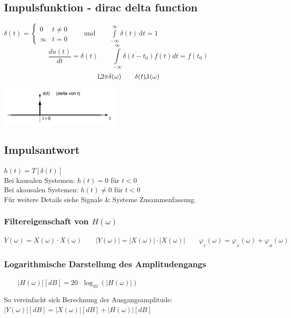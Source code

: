 \subsection{Impulsfunktion - dirac delta function}
	\begin{minipage}{10cm}
		$\delta (t)=\begin{cases} 0 & t\ne 0\\\infty & t=0\end{cases} \qquad
		\text{und} \qquad \int\limits_{-\infty}^\infty \delta(t) \, \mathrm dt = 1 $\\
		\[
			\frac{du(t)}{dt}=\delta(t) \qquad
			\int\limits_{-\infty}^{\infty}\delta(t-t_0)f(t)dt=f(t_0)
		\]
		\[
			1 \FT 2\pi \delta(\omega) \qquad \delta(t) \FT 1(\omega)
		\]
		 
	\end{minipage}
	\begin{minipage}{8cm}
		\includegraphics[width=6cm]{bilder/diracimpulse.png}
	\end{minipage}


	\subsection{Impulsantwort}
		$h(t) = T[\delta(t)] \qquad $\\
		Bei kausalen Systemen: $h(t) = 0$ für $t < 0$ \\   
		Bei akausalen Systemen: $h(t) \neq 0$ für $t < 0$\\ 
		Für weitere Details siehe Signale \& Systeme Zusammenfassung.
		\subsubsection{Filtereigenschaft von $H(\omega)$}
			$ Y(\omega) = X(\omega) \cdot X(\omega)
				\qquad |Y(\omega)| = |X(\omega)| \cdot |X(\omega)|
				\qquad \varphi_{_Y}(\omega) = \varphi_{_X}(\omega) + \varphi_{_H}(\omega)$
		
		\subsubsection{Logarithmische Darstellung des Amplitudengangs}
			$ \qquad |H(\omega)| [dB] = 20 \cdot \log_{10}(|H(\omega)|)\qquad$
			\parbox{10cm}{So vereinfacht sich Berechnung der 
				Ausgangsamplitude:\\
				\hspace*{0.5cm}$ |Y(\omega)| [dB] = |X(\omega)|[dB] + |H(\omega)| [dB]$
			}

